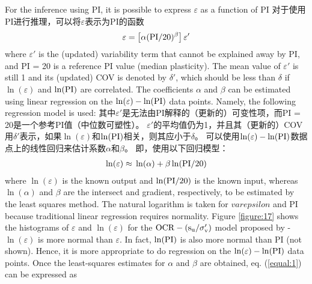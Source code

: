 
\begin{Parallel}{0.60\textwidth}{}
    \ParallelLText
    {
        For the inference using PI, it is possible to express $\varepsilon$ as a function of PI
    }
    \ParallelRText
    {
        对于使用PI进行推理，可以将$\varepsilon$表示为PI的函数
    }
    \ParallelPar
    \begin{align}
        \varepsilon=\left[\alpha(\rm{PI}/20)^\beta\right]\varepsilon'
        \label{equal:4}
    \end{align}
    \ParallelLText
    {
        where $\varepsilon'$ is the (updated) variability term that cannot be explained away by PI, and PI = 20 is a reference PI value (median plasticity). The mean value of $\varepsilon'$ is still 1 and its (updated) COV is denoted by $\delta'$, which should be less than $\delta$ if $\ln(\varepsilon)$ and $\ln(\rm{PI})$ are correlated. The coefficients $\alpha$ and $\beta$ can be estimated using linear regression on the $\ln(\varepsilon)-\ln(\rm{PI})$ data points. Namely, the following regression model is used:
    }
    \ParallelRText
    {
        其中$\varepsilon'$是无法由PI解释的（更新的）可变性项，而PI = 20是一个参考PI值（中位数可塑性）。 $\varepsilon'$的平均值仍为1，并且其（更新的）COV用$\delta'$表示，如果$\ln(\varepsilon)$和$\ln(\rm{PI})$相关，则其应小于$\delta$。 可以使用$\ln(\varepsilon)-\ln(\rm{PI})$数据点上的线性回归来估计系数$\alpha$和$\beta$。 即，使用以下回归模型：
    }
    \ParallelPar
    \begin{align}
        \ln(\varepsilon)\approx{}\ln(\alpha)+\beta\ln(\rm{PI}/20)
        \label{equal:5}
    \end{align}
    \ParallelLText
    {
        where $\ln(\varepsilon)$ is the known output and $\ln(\rm{PI}/20)$ is the known input, whereas $\ln(\alpha)$ and $\beta$ are the intersect and gradient, respectively, to be estimated by the least squares method. The natural logarithm is taken for $varepsilon$ and PI because traditional linear regression requires normality. Figure \ref{figure:17} shows the histograms of $\varepsilon$ and $\ln(\varepsilon)$ for the $\rm{OCR}-(s_u/\sigma_v')$ model proposed by \citet{Jamiolkowski198557} - $\ln(\varepsilon)$ is more normal than $\varepsilon$. In fact, $\ln(\rm{PI})$ is also more normal than PI (not shown). Hence, it is more appropriate to do regression on the $\ln(\varepsilon)-\ln(\rm{PI})$ data points. Once the least-squares estimates for $\alpha$ and $\beta$ are obtained, eq. (\ref{equal:1}) can be expressed as
}
\end{Parallel}
